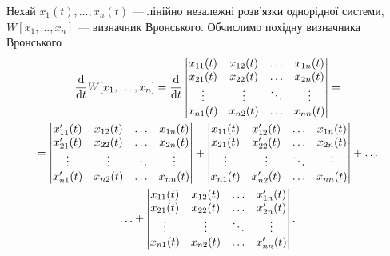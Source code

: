 Нехай $x_1(t), \ldots, x_n(t)$ --- лінійно незалежні розв'язки однорідної системи, $W[x_1, \ldots, x_n]$ --- визначник Вронського. Обчислимо похідну визначника Вронського
\begin{multline*}
	\frac{\mathop{}\!\mathrm{d}}{\mathop{}\!\mathrm{d} t} W[x_1, \ldots, x_n] = \frac{\mathop{}\!\mathrm{d}}{\mathop{}\!\mathrm{d} t} \begin{vmatrix} x_{11}(t) & x_{12}(t) & \ldots & x_{1n}(t) \\ x_{21}(t) & x_{22}(t) & \ldots & x_{2n}(t) \\ \vdots & \vdots & \ddots & \vdots \\ x_{n1}(t) & x_{n2}(t) & \ldots & x_{nn}(t) \end{vmatrix} = \\
	= \begin{vmatrix} x_{11}'(t) & x_{12}(t) & \ldots & x_{1n}(t) \\ x_{21}'(t) & x_{22}(t) & \ldots & x_{2n}(t) \\ \vdots & \vdots & \ddots & \vdots \\ x_{n1}'(t) & x_{n2}(t) & \ldots & x_{nn}(t) \end{vmatrix} + \begin{vmatrix} x_{11}(t) & x_{12}'(t) & \ldots & x_{1n}(t) \\ x_{21}(t) & x_{22}'(t) & \ldots & x_{2n}(t) \\ \vdots & \vdots & \ddots & \vdots \\ x_{n1}(t) & x_{n2}'(t) & \ldots & x_{nn}(t) \end{vmatrix} + \ldots \\
	\ldots + \begin{vmatrix} x_{11}(t) & x_{12}(t) & \ldots & x_{1n}'(t) \\ x_{21}(t) & x_{22}(t) & \ldots & x_{2n}'(t) \\ \vdots & \vdots & \ddots & \vdots \\ x_{n1}(t) & x_{n2}(t) & \ldots & x_{nn}'(t) \end{vmatrix}.
\end{multline*}

